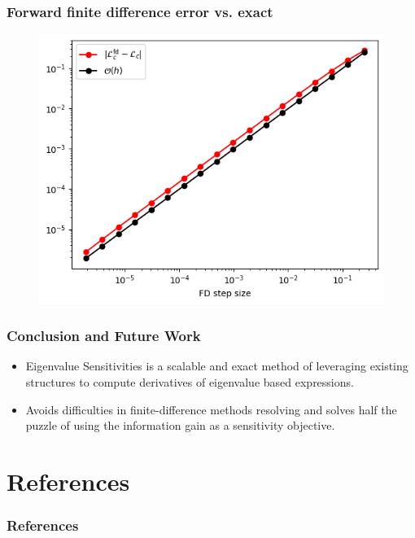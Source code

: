 \documentclass[
  pdf,
  10pt,
  xcolor={svgnames},
]{beamer}
\begin{document}
\begin{frame}
  \frametitle{Forward finite difference error vs. exact}
  \begin{figure}
    \centering
    \includegraphics[width=.65\textwidth]{./resources/infdim_fd_err.png}
  \end{figure}
\end{frame}

\begin{frame}
  \frametitle{Conclusion and Future Work}
  \begin{itemize}
    \item Eigenvalue Sensitivities is a scalable and exact method of leveraging
          existing structures to compute derivatives of eigenvalue based expressions.
    \item Avoids difficulties in finite-difference methods resolving and solves
          half the puzzle of using the information gain as a sensitivity objective.
  \end{itemize}
\end{frame}

\section{References}
\begin{frame}[allowframebreaks]
  \frametitle{References}
  \printbibliography
\end{frame}
\end{document}
